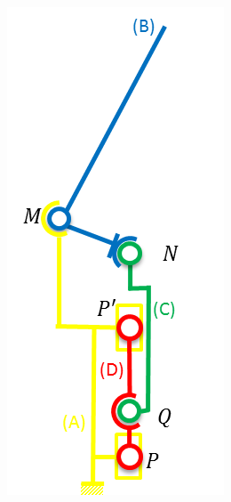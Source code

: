 \documentclass[10pt]{article}
\begin{document}
\begin{minipage}[c]{.2\linewidth}
\begin{center}
\includegraphics[width=.95\textwidth]{images/schema_archi}
\end{center}
\end{minipage}
\end{document}
